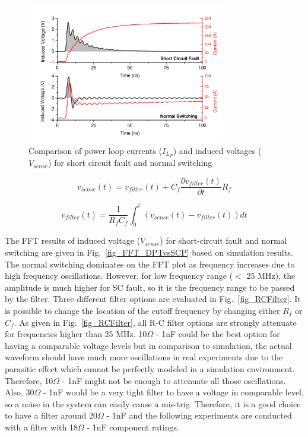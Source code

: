 \documentclass[journal]{IEEEtran}
\begin{document}
\begin{figure}[!t]
\centering
\includegraphics[width=3.4in]{Figures/Fig8-DPTvsSCP.pdf}
\caption{Comparison of power loop currents ($I_{L_P}$) and induced voltages ($V_{sense}$) for short circuit fault and normal switching}
\label{fig_DPTvsSCP}
\end{figure}

\begin{equation}
    \label{eq_filt_current}
    v_{sense}(t) = v_{filter}(t) + C_f\dfrac{\partial v_{filter}(t)}{\partial t}R_f
\end{equation}

\begin{equation}
    \label{eq_filt_voltage}
    v_{filter}(t) = \frac{1}{R_fC_f} \int_0^t{(v_{sense}(t) - v_{filter}(t))dt}
\end{equation}

The FFT results of induced voltage ($V_{sense}$) for short-circuit fault and normal switching are given in Fig.~\ref{fig_FFT_DPTvsSCP} based on simulation results. The normal switching dominates on the FFT plot as frequency increases due to high frequency oscillations. However, for low frequency range ($<$ 25 MHz), the amplitude is much higher for SC fault, so it is the frequency range to be passed by the filter. Three different filter options are evaluated in Fig.~\ref{fig_RCFilter}. It is possible to change the location of the cutoff frequency by changing either $R_f$ or $C_f$. As given in Fig.~\ref{fig_RCFilter}, all R-C filter options are strongly attenuate for frequencies higher than 25 MHz. 10$\Omega$ - 1nF could be the best option for having a comparable voltage levels but in comparison to simulation, the actual waveform should have much more oscillations in real experiments due to the parasitic effect which cannot be perfectly modeled in a simulation environment. Therefore, 10$\Omega$ - 1nF might not be enough to attenuate all those oscillations. Also, 30$\Omega$ - 1nF would be a very tight filter to have a voltage in comparable level, so  a noise in the system can easily cause a mis-trig. Therefore, it is a good choice to have a filter around 20$\Omega$ - 1nF and the following experiments are conducted with a filter with 18$\Omega$ - 1nF component ratings.
\end{document}
